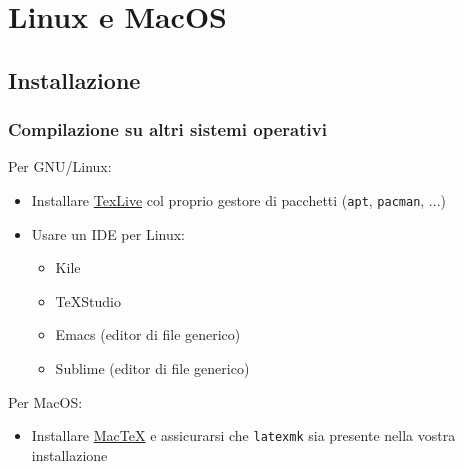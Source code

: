 \section{Linux e MacOS}
\subsection{Installazione}
\begin{frame}
  \frametitle{Compilazione su altri sistemi operativi}
  
  Per GNU/Linux:
  \begin{itemize}
   \item Installare \href{http://www.tug.org/texlive/}{TexLive} col proprio 
gestore di pacchetti (\texttt{apt}, \texttt{pacman}, ...)
   \item Usare un IDE per Linux:
   \begin{itemize}
    \item Kile
    \item TeXStudio
    \item Emacs (editor di file generico)
    \item Sublime (editor di file generico)
   \end{itemize}
  \end{itemize}
  
  Per MacOS:
  \begin{itemize}
   \item Installare \href{http://www.tug.org/mactex/}{MacTeX} e assicurarsi che 
\texttt{latexmk} sia presente nella vostra installazione 
  \end{itemize}
\end{frame}


